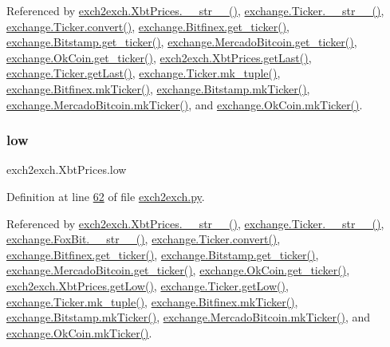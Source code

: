 Referenced by \hyperlink{exch2exch_8py_source_l00091}{exch2exch.\+Xbt\+Prices.\+\_\+\+\_\+str\+\_\+\+\_\+()}, \hyperlink{exchange_8py_source_l00136}{exchange.\+Ticker.\+\_\+\+\_\+str\+\_\+\+\_\+()}, \hyperlink{exchange_8py_source_l00069}{exchange.\+Ticker.\+convert()}, \hyperlink{exchange_8py_source_l00439}{exchange.\+Bitfinex.\+get\+\_\+ticker()}, \hyperlink{exchange_8py_source_l00511}{exchange.\+Bitstamp.\+get\+\_\+ticker()}, \hyperlink{exchange_8py_source_l00651}{exchange.\+Mercado\+Bitcoin.\+get\+\_\+ticker()}, \hyperlink{exchange_8py_source_l00716}{exchange.\+Ok\+Coin.\+get\+\_\+ticker()}, \hyperlink{exch2exch_8py_source_l00082}{exch2exch.\+Xbt\+Prices.\+get\+Last()}, \hyperlink{exchange_8py_source_l00112}{exchange.\+Ticker.\+get\+Last()}, \hyperlink{exchange_8py_source_l00121}{exchange.\+Ticker.\+mk\+\_\+tuple()}, \hyperlink{exchange_8py_source_l00453}{exchange.\+Bitfinex.\+mk\+Ticker()}, \hyperlink{exchange_8py_source_l00525}{exchange.\+Bitstamp.\+mk\+Ticker()}, \hyperlink{exchange_8py_source_l00665}{exchange.\+Mercado\+Bitcoin.\+mk\+Ticker()}, and \hyperlink{exchange_8py_source_l00730}{exchange.\+Ok\+Coin.\+mk\+Ticker()}.

\mbox{\label{classexch2exch_1_1_xbt_prices_a8cef13f833a894d4fc5b8296bb4906fa}} 
\subsubsection{\texorpdfstring{low}{low}}
{\footnotesize\ttfamily exch2exch.\+Xbt\+Prices.\+low}



Definition at line \hyperlink{exch2exch_8py_source_l00062}{62} of file \hyperlink{exch2exch_8py_source}{exch2exch.\+py}.



Referenced by \hyperlink{exch2exch_8py_source_l00091}{exch2exch.\+Xbt\+Prices.\+\_\+\+\_\+str\+\_\+\+\_\+()}, \hyperlink{exchange_8py_source_l00136}{exchange.\+Ticker.\+\_\+\+\_\+str\+\_\+\+\_\+()}, \hyperlink{exchange_8py_source_l00610}{exchange.\+Fox\+Bit.\+\_\+\+\_\+str\+\_\+\+\_\+()}, \hyperlink{exchange_8py_source_l00069}{exchange.\+Ticker.\+convert()}, \hyperlink{exchange_8py_source_l00439}{exchange.\+Bitfinex.\+get\+\_\+ticker()}, \hyperlink{exchange_8py_source_l00511}{exchange.\+Bitstamp.\+get\+\_\+ticker()}, \hyperlink{exchange_8py_source_l00651}{exchange.\+Mercado\+Bitcoin.\+get\+\_\+ticker()}, \hyperlink{exchange_8py_source_l00716}{exchange.\+Ok\+Coin.\+get\+\_\+ticker()}, \hyperlink{exch2exch_8py_source_l00079}{exch2exch.\+Xbt\+Prices.\+get\+Low()}, \hyperlink{exchange_8py_source_l00109}{exchange.\+Ticker.\+get\+Low()}, \hyperlink{exchange_8py_source_l00121}{exchange.\+Ticker.\+mk\+\_\+tuple()}, \hyperlink{exchange_8py_source_l00453}{exchange.\+Bitfinex.\+mk\+Ticker()}, \hyperlink{exchange_8py_source_l00525}{exchange.\+Bitstamp.\+mk\+Ticker()}, \hyperlink{exchange_8py_source_l00665}{exchange.\+Mercado\+Bitcoin.\+mk\+Ticker()}, and \hyperlink{exchange_8py_source_l00730}{exchange.\+Ok\+Coin.\+mk\+Ticker()}.


